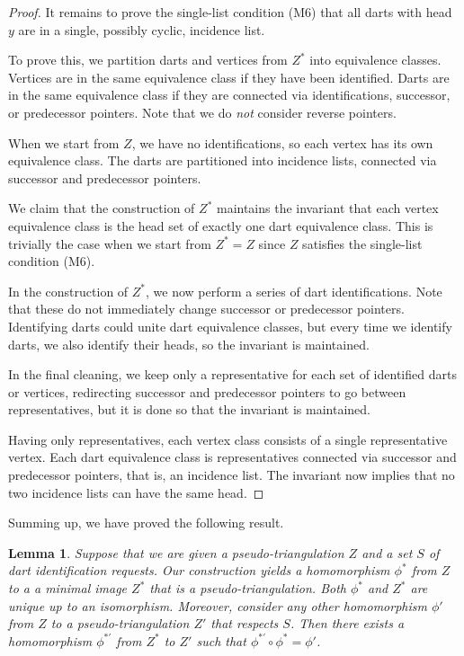 \documentclass[10pt,a4paper]{article}
\newtheorem{lem}[thm]{Lemma}
\begin{document}
\begin{proof}
It remains to prove the single-list condition (M6) that all darts with head $y$ are in a single, possibly cyclic, incidence
list.

To prove this, we 
partition darts and vertices from $Z^*$ into
equivalence classes.
Vertices are in the same equivalence class if they have been identified. Darts
are in the same equivalence class if they are connected via identifications, successor, or predecessor pointers. Note that we do \emph{not} consider reverse pointers.

When we start from $Z$, we have
no identifications, so each vertex has its own equivalence class. The darts are partitioned into incidence lists, connected via successor and predecessor pointers.

We claim that the construction of $Z^*$ maintains the invariant that each vertex equivalence class
is the head set of
exactly one dart equivalence class. This is trivially the case when
we start from $Z^*=Z$ since $Z$ satisfies the single-list condition (M6).

In the construction of $Z^*$, we now perform a series of dart identifications. Note that these do not immediately change successor or predecessor pointers. Identifying darts could unite dart equivalence classes, but every time we identify darts, we also identify their heads, so the
invariant is maintained.

In the final cleaning, we keep only a representative for each set of identified darts or vertices, redirecting successor and predecessor pointers to go between representatives, but it is done so that the invariant is maintained.

Having only representatives,  each vertex class consists of a single representative vertex. Each dart equivalence
class is representatives connected via successor and predecessor pointers, that is, an incidence list. The invariant now implies that no two incidence lists
can have the same head.
\end{proof}



Summing up, we have proved the following result.

\begin{lem}\label{lem:free-homo-trian}
Suppose that we are given a pseudo-triangulation $Z$ and a set $S$ of dart identification requests. Our construction yields
a homomorphism $\phi^*$ from $Z$ to a a minimal image $Z^*$
that is a pseudo-triangulation. Both $\phi^*$ and $Z^*$ are unique up to an isomorphism. 
Moreover, consider any other homomorphism $\phi'$ from $Z$ to a 
pseudo-triangulation $Z'$ that respects $S$. Then there
exists a homomorphism $\phi^{*\prime}$ from $Z^*$ to $Z'$ such that 
$\phi^{*\prime}\circ\phi^*=\phi'$.
\end{lem}
\end{document}
